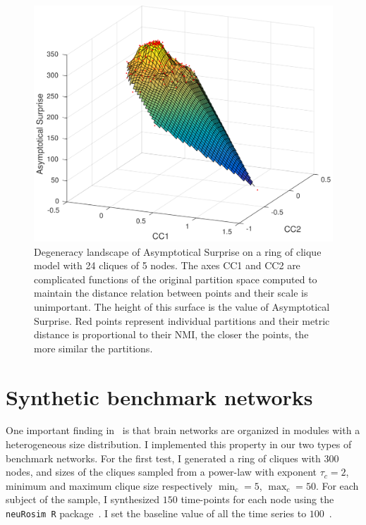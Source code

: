 \begin{figure}[!htb]
\centering
\includegraphics[width=1.0\textwidth]{images/filtered_asymp_surp_ring_cliques_5_24_200.png}
\caption{Degeneracy landscape of Asymptotical Surprise on a ring of clique model with 24 cliques of 5 nodes.
The axes CC1 and CC2 are complicated functions of the original partition space computed to maintain the distance relation between points and their scale is unimportant.
The height of this surface is the value of Asymptotical Surprise.
Red points represent individual partitions and their metric distance is proportional to their NMI, the closer the points, the more similar the partitions.}
\label{fig:degeneracy_asymptotical_surprise}
\end{figure}


\section{Synthetic benchmark networks}
One important finding in~\cite{nicolini2016} is that brain networks are organized in modules with a heterogeneous size distribution.
I implemented this property in our two types of benchmark networks.
For the first test, I generated a ring of cliques with $300$ nodes, and sizes of the cliques sampled from a power-law with exponent $\tau_c=2$, minimum and maximum clique size respectively $\min_c=5$, $\max_c=50$.
For each subject of the sample, I synthesized $150$ time-points for each node using the \texttt{neuRosim R} package~\cite{neurosim2011}.
I set the baseline value of all the time series to $100$~\cite{welvaert2013}.


